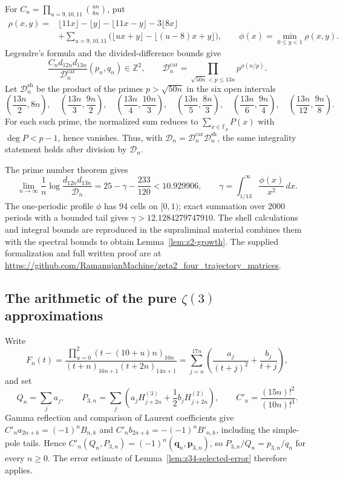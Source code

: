 \documentclass[oneside,english,11pt]{amsart}
\begin{document}
For $C_n=\prod_{u=9,10,11}\binom{un}{8n}$, put
\[
\begin{aligned}
 \rho(x,y)={}&\lfloor11x\rfloor-\lfloor y\rfloor-\lfloor11x-y\rfloor
             -3\lfloor8x\rfloor\\
 &+\sum_{u=9,10,11}
   \bigl(\lfloor ux+y\rfloor-\lfloor(u-8)x+y\rfloor\bigr),
 \qquad \phi(x)=\min_{0\le y<1}\rho(x,y).
\end{aligned}
\]
Legendre's formula and the divided-difference bounds give
\[
 \frac{C_nd_{12n}d_{13n}}{\mathcal D_n^{\mathrm{car}}}
 (p_n,q_n)\in\mathbb Z^2,\qquad
 \mathcal D_n^{\mathrm{car}}
 =\prod_{\sqrt{50n}<p\le13n}p^{\phi(n/p)}.
\]
Let $\mathcal D_n^{\mathrm{sh}}$ be the product of the primes
$p>\sqrt{50n}$ in the six open intervals
\[
 \left(\frac{13n}{2},8n\right),\quad
 \left(\frac{13n}{3},\frac{9n}{2}\right),\quad
 \left(\frac{13n}{4},\frac{10n}{3}\right),\quad
 \left(\frac{13n}{5},\frac{8n}{3}\right),\quad
 \left(\frac{13n}{6},\frac{9n}{4}\right),\quad
 \left(\frac{13n}{12},\frac{9n}{8}\right).
\]
For each such prime, the normalized sum reduces to
$\sum_{x\in\mathbb F_p}P(x)$ with $\deg P<p-1$, hence vanishes.
Thus, with $\mathcal D_n=\mathcal D_n^{\mathrm{car}}
\mathcal D_n^{\mathrm{sh}}$, the same integrality statement holds
after division by $\mathcal D_n$.

The prime number theorem gives
\[
 \lim_{n\to\infty}\frac1n
 \log\frac{d_{12n}d_{13n}}{\mathcal D_n}
 =25-\gamma-\frac{233}{120}<10.929906,\qquad
 \gamma=\int_{1/13}^{\infty}\frac{\phi(x)}{x^2}\,dx.
\]
The one-periodic profile $\phi$ has $94$ cells on $[0,1)$;
exact summation over $2000$ periods with a bounded tail gives
$\gamma>12.1284279747910$.
The shell calculations and integral bounds are reproduced in
the supraliminal material
combines them with the spectral bounds to obtain Lemma~\ref{lem:z2-growth}.
The supplied formalization and full written proof are at
\url{https://github.com/RamanujanMachine/zeta2_four_trajectory_matrices}.

\subsection{The arithmetic of the pure
\texorpdfstring{$\zeta(3)$}{zeta(3)} approximations}
\label{app:zeta3-measure}

Write
\[
 F_n(t)=\frac{\prod_{u=0}^{2}(t-(10+u)n)_{10n}}
 {(t+n)_{16n+1}(t+2n)_{14n+1}}
 =\sum_{j=n}^{17n}\left(\frac{a_j}{(t+j)^2}+\frac{b_j}{t+j}\right),
\]
and set
\[
 Q_n=\sum_ja_j,\qquad
 P_{3,n}=\sum_j\left(a_jH^{(3)}_{j+2n}
                       +\frac12b_jH^{(2)}_{j+2n}\right),\qquad
 C'_n=\frac{(15n)!^2}{(10n)!^3}.
\]
Gamma reflection and comparison of Laurent coefficients give
$C'_na_{2n+k}=(-1)^nB_{n,k}$ and
$C'_nb_{2n+k}=-(-1)^nB'_{n,k}$, including the simple-pole tails.
Hence $C'_n(Q_n,P_{3,n})=(-1)^n(\mathbf q_n,\mathbf p_{3,n})$,
so $P_{3,n}/Q_n=p_{3,n}/q_n$ for every $n\ge0$.
The error estimate of Lemma~\ref{lem:z34-selected-error} therefore applies.
\end{document}
